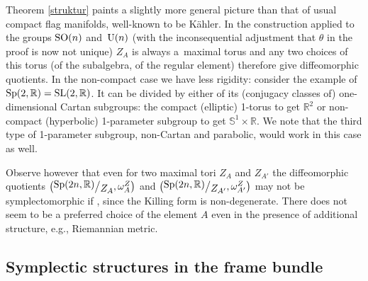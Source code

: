 \documentclass[pdftex]{sigma}
\numberwithin{equation}{section}
\newcommand{\bigslant}[2]{{\raisebox{.2em}{$#1$}\big/\raisebox{-.2em}{$#2$}}}
\begin{document}
\begin{Remark} Theorem \ref{struktur} paints a slightly more general picture than that of usual compact flag manifolds, well-known to be K\"ahler. In the construction applied to the groups ${\rm SO}(n)$ and~${\rm U}(n)$ (with the inconsequential adjustment that $\theta$ in the proof is now not unique) $Z_A$ is always a~maximal torus and any two choices of this torus (of the subalgebra, of the regular element) therefore give diffeomorphic quotients. In the non-compact case we have less rigidity: consider the example of ${\rm Sp}(2,\mathbb{R})={\rm SL}(2,\mathbb{R})$. It can be divided by either of its (conjugacy classes of) one-dimensional Cartan subgroups: the compact (elliptic) 1-torus to get $\mathbb{R}^2$ or non-compact (hyperbolic) 1-parameter subgroup to get $\mathbb{S}^1\times \mathbb{R}$. We note that the third type of 1-parameter subgroup, non-Cartan and parabolic, would work in this case as well.
\end{Remark}
\begin{Remark} Observe however that even for two maximal tori $Z_A$ and $Z_{A'}$ the diffeomorphic quotients $\big(\bigslant{{\rm Sp}(2n,\mathbb{R})}{Z_A},\omega^{Z}_{A}\big)$ and $\big(\bigslant{{\rm Sp}(2n,\mathbb{R})}{Z_{A'}},\omega^{Z}_{A'}\big)$ may not be symplectomorphic if , since the Killing form is non-degenerate. There does not seem to be a preferred choice of the element $A$ even in the presence of additional structure, e.g., Riemannian metric.
\end{Remark}

\subsection{Symplectic structures in the frame bundle}
\end{document}
